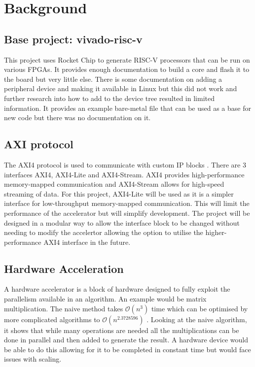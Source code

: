 \section{Background}
\label{sec:background}

\subsection{Base project: vivado-risc-v}
This project uses Rocket Chip to generate RISC-V processors that can be run on various FPGAs. It provides enough documentation to build a core and flash it to the board but very little else. There is some documentation on adding a peripheral device and making it available in Linux but this did not work and further research into how to add to the device tree resulted in limited information. It provides an example bare-metal file that can be used as a base for new code but there was no documentation on it.

\newpage
\subsection{AXI protocol}
The AXI4 protocol is used to communicate with custom IP blocks \cite{axi}. There are 3 interfaces AXI4, AXI4-Lite and AXI4-Stream. AXI4 provides high-performance memory-mapped communication and AXI4-Stream allows for high-speed streaming of data. For this project, AXI4-Lite will be used as it is a simpler interface for low-throughput memory-mapped communication. This will limit the performance of the accelerator but will simplify development. The project will be designed in a modular way to allow the interface block to be changed without needing to modify the accelertor allowing the option to utilise the higher-performance AXI4 interface in the future.

\subsection{Hardware Acceleration}
A hardware accelerator is a block of hardware designed to fully exploit the parallelism available in an algorithm. An example would be matrix multiplication. The naive method takes $\mathcal{O}(n^{3})$ time which can be optimised by more complicated algorithms to $\mathcal{O}(n^{2.3728596})$ \citep{alman2020refined}. Looking at the naive algorithm, it shows that while many operations are needed all the multiplications can be done in parallel and then added to generate the result. A hardware device would be able to do this allowing for it to be completed in constant time but would face issues with scaling.

